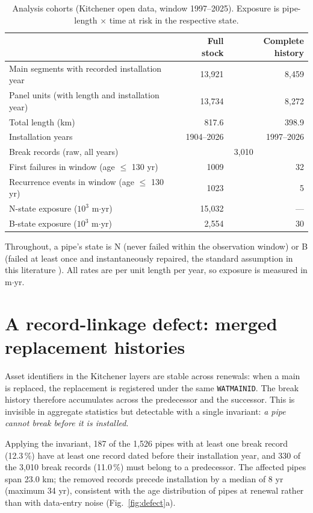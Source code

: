\documentclass[review,12pt,authoryear]{elsarticle}
\begin{document}
\begin{table}[!t]
\centering
\footnotesize
\caption{Analysis cohorts (Kitchener open data, window 1997--2025).
Exposure is pipe-length $\times$ time at risk in the respective state.}
\label{tab:data}
\begin{tabular}{lrr}
\toprule
 & Full stock & Complete history \\
\midrule
Main segments with recorded installation year & 13,921 & 8,459 \\
Panel units (with length and installation year) & 13,734 & 8,272 \\
Total length (km) & 817.6 & 398.9 \\
Installation years & 1904--2026 & 1997--2026 \\
Break records (raw, all years) & \multicolumn{2}{c}{3,010} \\
First failures in window (age $\le$ 130 yr) & 1009 & 32 \\
Recurrence events in window (age $\le$ 130 yr) & 1023 & 5 \\
N-state exposure ($10^3$ m$\cdot$yr) & 15,032 & --- \\
B-state exposure ($10^3$ m$\cdot$yr) & 2,554 & 30 \\
\bottomrule
\end{tabular}
\end{table}

Throughout, a pipe's state is N (never failed within the observation
window) or B (failed at least once and instantaneously repaired, the
standard assumption in this literature \citep{LeGat2013,Scheidegger2015}).
All rates are per unit length per year, so exposure is measured in
m$\cdot$yr.

\section{A record-linkage defect: merged replacement histories}
\label{sec:defect}

Asset identifiers in the Kitchener layers are stable across renewals: when a
main is replaced, the replacement is registered under the same
\texttt{WATMAINID}. The break history therefore accumulates across the
predecessor and the successor. This is invisible in aggregate statistics but
detectable with a single invariant: \emph{a pipe cannot break before it is
installed}.

Applying the invariant, 187 of the 1,526 pipes with at least one
break record (12.3\,\%) have at least one record dated before their
installation year, and 330 of the 3,010 break records
(11.0\,\%) must belong to a predecessor. The affected pipes span
23.0 km; the removed records precede installation by a median of
8 yr (maximum 34 yr), consistent with the age distribution
of pipes at renewal rather than with data-entry noise
(Fig.~\ref{fig:defect}a).
\end{document}
